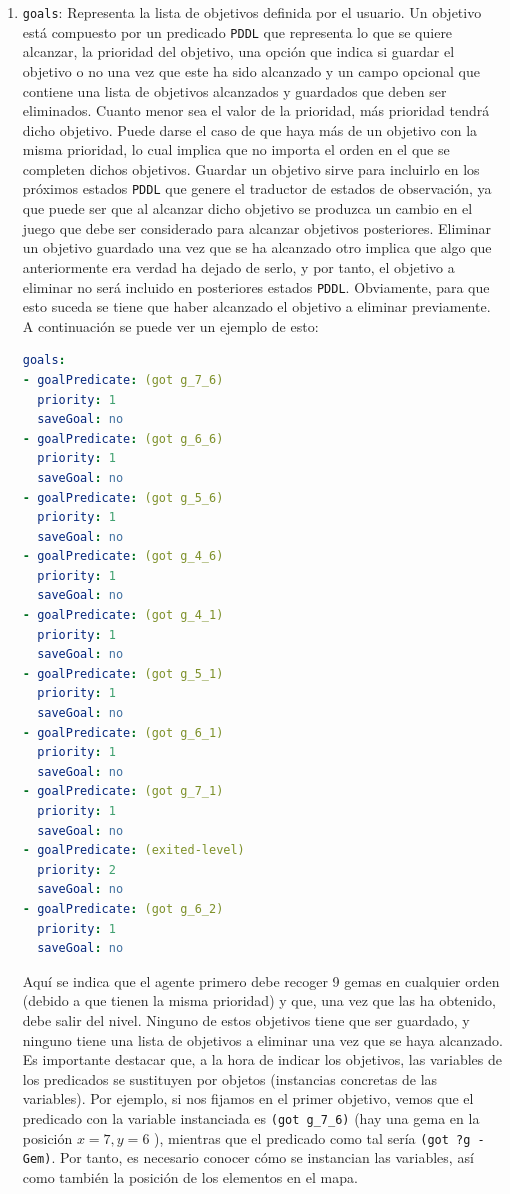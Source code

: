 \begin{enumerate}
    \item \texttt{goals}: Representa la lista de objetivos definida por el usuario. Un objetivo está compuesto
    por un predicado \texttt{PDDL} que representa lo que se quiere alcanzar, la prioridad del objetivo, una
    opción que indica si guardar el objetivo o no una vez que este ha sido alcanzado y un campo opcional
    que contiene una lista de objetivos alcanzados y guardados que deben ser eliminados. Cuanto menor
    sea el valor de la prioridad, más prioridad tendrá dicho objetivo. Puede darse el caso de que haya
    más de un objetivo con la misma prioridad, lo cual implica que no importa el orden en el que se
    completen dichos objetivos. Guardar un objetivo sirve para incluirlo en los próximos estados \texttt{PDDL}
    que genere el traductor de estados de observación, ya que puede ser que al alcanzar dicho objetivo
    se produzca un cambio en el juego que debe ser considerado para alcanzar objetivos posteriores.
    Eliminar un objetivo guardado una vez que se ha alcanzado otro implica que algo que anteriormente
    era verdad ha dejado de serlo, y por tanto, el objetivo a eliminar no será incluido en posteriores
    estados \texttt{PDDL}. Obviamente, para que esto suceda se tiene que haber alcanzado el objetivo a
    eliminar previamente. A continuación se puede ver un ejemplo de esto:
    
    \begin{lstlisting}[language=yaml]
goals:
- goalPredicate: (got g_7_6)
  priority: 1
  saveGoal: no
- goalPredicate: (got g_6_6)
  priority: 1
  saveGoal: no
- goalPredicate: (got g_5_6)
  priority: 1
  saveGoal: no
- goalPredicate: (got g_4_6)
  priority: 1
  saveGoal: no
- goalPredicate: (got g_4_1)
  priority: 1
  saveGoal: no
- goalPredicate: (got g_5_1)
  priority: 1
  saveGoal: no
- goalPredicate: (got g_6_1)
  priority: 1
  saveGoal: no
- goalPredicate: (got g_7_1)
  priority: 1
  saveGoal: no
- goalPredicate: (exited-level)
  priority: 2
  saveGoal: no
- goalPredicate: (got g_6_2)
  priority: 1
  saveGoal: no
    \end{lstlisting}
    
    Aquí se indica que el agente primero debe recoger 9 gemas en cualquier orden (debido a que tienen la misma
    prioridad) y que, una vez que las ha obtenido, debe salir del nivel. Ninguno de estos objetivos tiene que ser
    guardado, y ninguno tiene una lista de objetivos a eliminar una vez que se haya alcanzado. Es importante destacar
    que, a la hora de indicar los objetivos, las variables de los predicados se sustituyen por objetos (instancias
    concretas de las variables). Por ejemplo, si nos fijamos en el primer objetivo, vemos que el predicado con la
    variable instanciada es \texttt{(got g\_7\_6)} (hay una gema en la posición $x = 7, y= 6$ ), mientras que el
    predicado como tal sería \texttt{(got ?g - Gem)}. Por tanto, es necesario conocer cómo se instancian las
    variables, así como también la posición de los elementos en el mapa.
\end{enumerate}